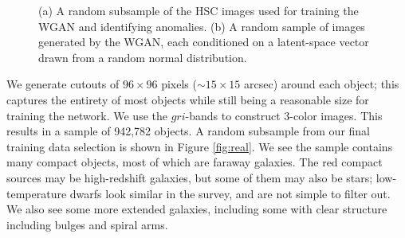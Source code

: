 \begin{figure}
  \centering
  \hspace{2em}
\caption{(a) A random subsample of the HSC images used for training the WGAN and identifying anomalies. (b) A random sample of images generated by the WGAN, each conditioned on a latent-space vector drawn from a random normal distribution.}
\end{figure}

We generate cutouts of $96 \times 96$ pixels ($\sim15\times 15$ arcsec) around each object; this captures the entirety of most objects while still being a reasonable size for training the network.
We use the $gri$-bands to construct 3-color images.
This results in a sample of 942,782 objects.
A random subsample from our final training data selection is shown in Figure \ref{fig:real}.
We see the sample contains many compact objects, most of which are faraway galaxies.
The red compact sources may be high-redshift galaxies, but some of them may also be stars; low-temperature dwarfs look similar in the survey, and are not simple to filter out.
We also see some more extended galaxies, including some with clear structure including bulges and spiral arms. 

